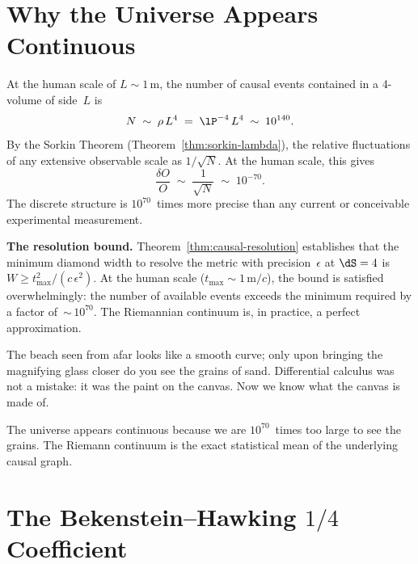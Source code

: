 \section{Why the Universe Appears Continuous}
\label{sec:why-continuous}

At the human scale of $L \sim 1\,\text{m}$, the number of causal
events contained in a 4-volume of side~$L$ is
\begin{equation}
  N \;\sim\; \rho\,L^4
  \;=\; \lP^{-4}\,L^4
  \;\sim\; 10^{140}.
  \label{eq:events-human-scale}
\end{equation}
By the Sorkin Theorem (Theorem~\ref{thm:sorkin-lambda}), the relative
fluctuations of any extensive observable scale as $1/\sqrt{N}$. At
the human scale, this gives
\[
  \frac{\delta O}{O} \;\sim\; \frac{1}{\sqrt{N}}
  \;\sim\; 10^{-70}.
\]
The discrete structure is $10^{70}$~times more precise than any
current or conceivable experimental measurement.

\medskip\noindent\textbf{The resolution bound.}\quad
Theorem~\ref{thm:causal-resolution} establishes that the minimum
diamond width to resolve the metric with precision~$\epsilon$ at
$\dS = 4$ is $W \geq t_{\max}^2/(c\,\epsilon^2)$. At the human
scale ($t_{\max} \sim 1\,\text{m}/c$), the bound is satisfied
overwhelmingly: the number of available events exceeds the minimum
required by a factor of~${\sim}\,10^{70}$. The Riemannian continuum
is, in practice, a perfect approximation.

\medskip\noindent
The beach seen from afar looks like a smooth curve; only upon bringing
the magnifying glass closer do you see the grains of sand. Differential
calculus was not a mistake: it was the paint on the canvas. Now we know
what the canvas is made of.

\begin{result}[title={The Unapparence of Discreteness}]
The universe appears continuous because we are $10^{70}$~times too
large to see the grains. The Riemann continuum is the exact
statistical mean of the underlying causal graph.
\end{result}

\section{The Bekenstein--Hawking $1/4$ Coefficient}
\label{sec:bekenstein-hawking}

